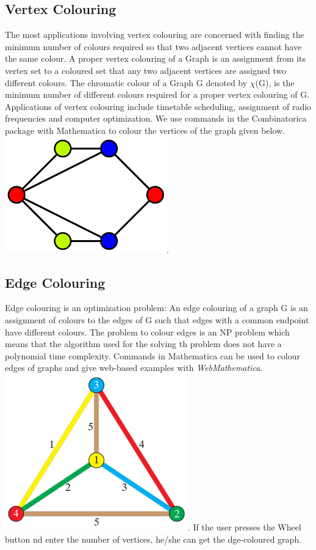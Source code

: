 \documentclass{article}
\begin{document}
\subsection{Vertex Colouring}
The most applications involving vertex colouring are concerned with finding the minimum number of colours required so that two adjacent vertices cannot have the same colour. A proper vertex colouring of a Graph is an assignment from its vertex set to a coloured set that any two adjacent vertices are assigned two different colours. \hfill \break
The chromatic colour of a Graph G denoted by \(\chi\)(G), is the minimum number of different colours required for a proper vertex colouring of G. \hfill \break Applications of vertex colouring include timetable scheduling, assignment of radio frequencies and computer optimization. We use commands in the Combinatorica package with Mathematica to colour the vertices of the graph given below\cite{3}. \hfill \break
\hfill \break
\includegraphics{vertexcolouring}.
\hfill \break

\subsection{Edge Colouring}
Edge colouring is an optimization problem: An edge colouring of a graph G is an assignment of colours to the edges of G such that edges with a common endpoint have different colours. The problem to colour edges is an NP problem which means that the algorithm used for the solving th problem does not have a polynomial time complexity.\hfill \break
Commands in Mathematica can be used to colour edges of graphs and give web-based examples with \textit{WebMathematica}\cite{3}.\hfill \break
\hfill \break
\includegraphics{edgescolouring}. \hfill \break
\hfill \break
If the user presses the Wheel button nd enter the number of vertices, he/she can get the dge-coloured graph.
\end{document}
